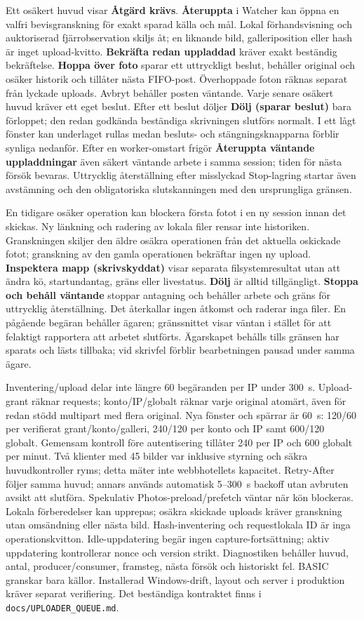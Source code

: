\documentclass[11pt,a4paper]{article}
\newcommand{\ui}[1]{\textbf{#1}}
\begin{document}
Ett osäkert huvud visar \ui{Åtgärd krävs}. \ui{Återuppta} i Watcher kan öppna
en valfri bevisgranskning för exakt sparad källa och mål.
Lokal förhandsvisning och auktoriserad fjärrobservation skiljs åt; en liknande
bild, galleriposition eller hash är inget upload-kvitto.
\ui{Bekräfta redan uppladdad} kräver exakt beständig bekräftelse.
\ui{Hoppa över foto} sparar ett uttryckligt beslut, behåller original och
osäker historik och tillåter nästa FIFO-post. Överhoppade foton räknas separat
från lyckade uploads. Avbryt behåller posten väntande. Varje senare osäkert
huvud kräver ett eget beslut.
Efter ett beslut döljer \ui{Dölj (sparar beslut)} bara förloppet;
den redan godkända beständiga skrivningen slutförs normalt.
I ett lågt fönster kan underlaget rullas medan besluts- och stängningsknapparna
förblir synliga nedanför.
Efter en worker-omstart frigör \ui{Återuppta väntande uppladdningar} även säkert
väntande arbete i samma session; tiden för nästa försök bevaras.
Uttrycklig återställning efter misslyckad Stop-lagring startar även avstämning
och den obligatoriska slutskanningen med den ursprungliga gränsen.

En tidigare osäker operation kan blockera första fotot i en ny session innan
det skickas. Ny länkning och radering av lokala filer rensar inte historiken.
Granskningen skiljer den äldre osäkra operationen från det aktuella oskickade
fotot; granskning av den gamla operationen bekräftar ingen ny upload.
\ui{Inspektera mapp (skrivskyddat)} visar separata filsystemresultat utan att
ändra kö, startundantag, gräns eller livestatus. \ui{Dölj} är alltid tillgängligt.
\ui{Stoppa och behåll väntande} stoppar antagning och behåller arbete och gräns
för uttrycklig återställning. Det återkallar ingen åtkomst och raderar inga
filer. En pågående begäran behåller ägaren; gränssnittet visar väntan i stället
för att felaktigt rapportera att arbetet slutförts.
Ägarskapet behålls tills gränsen har sparats och lästs tillbaka; vid skrivfel
förblir bearbetningen pausad under samma ägare.

Inventering/upload delar inte längre 60 begäranden per IP under 300~s.
Upload-grant räknar requests; konto/IP/globalt räknar varje original atomärt,
även för redan stödd multipart med flera original.
Nya fönster och spärrar är 60~s: 120/60 per verifierat grant/konto/galleri,
240/120 per konto och IP samt 600/120 globalt. Gemensam kontroll före
autentisering tillåter 240 per IP och 600 globalt per minut. Två klienter
med 45 bilder var inklusive styrning och säkra huvudkontroller ryms;
detta mäter inte webbhotellets kapacitet. Retry-After följer samma huvud;
annars används automatisk 5--300~s backoff utan avbruten avsikt att slutföra.
Spekulativ Photos-preload/prefetch väntar när kön blockeras. Lokala
förberedelser kan upprepas; osäkra skickade uploads kräver granskning utan
omsändning eller nästa bild. Hash-inventering och requestlokala ID är inga
operationskvitton. Idle-uppdatering begär ingen capture-fortsättning;
aktiv uppdatering kontrollerar nonce och version strikt. Diagnostiken
behåller huvud, antal, producer/consumer, framsteg, nästa försök och
historiskt fel. BASIC granskar bara källor. Installerad Windows-drift,
layout och server i produktion kräver separat verifiering.
Det beständiga kontraktet finns i \texttt{docs/UPLOADER\_QUEUE.md}.
\end{document}
